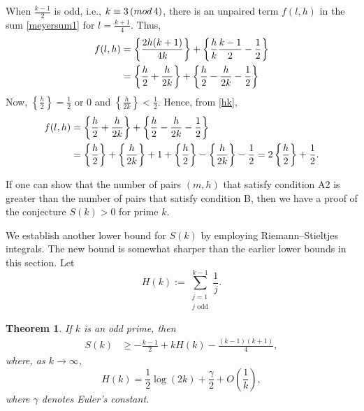 \documentclass[11pt,reqno]{amsart}
\newcommand{\df}{\dfrac}
\renewcommand{\pmod}[1]{\,(\textup{mod}\,#1)}
\theoremstyle{plain}
\numberwithin{equation}{section}
\newtheorem{theorem}{Theorem}[section]
\begin{document}
When $\frac{k-1}{2}$ is odd, i.e., $k\equiv3\pmod 4$, there is an unpaired term $f(l,h)$  in the sum \eqref{meyersum1} for $l=\frac{k+1}{4}$. Thus,
\begin{align}
    f(l,h)&=\left\{\frac{2h(k+1)}{4k}\right\}+\left\{\frac{h}{k}\frac{k-1}{2}-\frac{1}{2}\right\}\notag\\
    &=\left\{\frac{h}{2}+\frac{h}{2k}\right\}+\left\{\frac{h}{2}-\frac{h}{2k} -\frac{1}{2}\right\}\label{hk}
    \end{align}
Now, $\left\{\frac{h}{2}\right\}=\frac{1}{2}$ or $0$ and  $\left\{\frac{h}{2k}\right\}<\frac{1}{2}$.
Hence, from \eqref{hk},
\begin{align}
f(l,h)&=\left\{\frac{h}{2}+\frac{h}{2k}\right\}+\left\{\frac{h}{2}-\frac{h}{2k} -\frac{1}{2}\right\}\notag
\\&=\left\{\frac{h}{2}\right\}+\left\{\frac{h}{2k}\right\}+1+\left\{\frac{h}{2}\right\}-\left\{\frac{h}{2k}\right\}-\frac{1}{2}=2\left\{\frac{h}{2}\right\}+\frac{1}{2}.
\label{hk1}
\end{align}

\bigskip

If one can show that the number of pairs $(m,h)$ that satisfy condition A2 is greater than the number of pairs that satisfy condition B, then we have a proof of the conjecture $S(k)>0$ for prime $k$.




We establish another lower bound for $S(k)$ by employing Riemann--Stieltjes  integrals. The new bound is somewhat sharper than the earlier lower bounds in this section.  Let
$$ H(k):=\sum_{\substack{j=1\\j \text{ odd}}}^{k-1}\df{1}{j}.$$

\begin{theorem}\label{theorem2} If $k$ is an odd prime, then
 \begin{align*}
	S(k)
	&\geq -\frac{k-1}{2}+kH(k)-\frac{(k-1)(k+1)}{4},
\end{align*}
where, as $k\to\infty$,
 $$H(k)=\frac{1}{2}\log\left(2k\right)+\frac{\gamma}{2}+O\left(\frac{1}{k}\right),$$
where $\gamma$ denotes Euler's constant.
\end{theorem}
\end{document}
